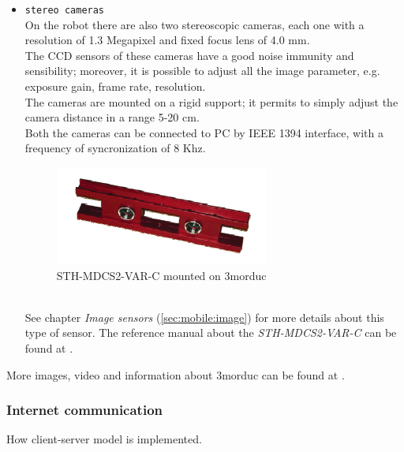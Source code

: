 \begin{itemize}
\item \texttt{stereo cameras} \\
  On the robot there are also two stereoscopic cameras, each one with a
  resolution of 1.3 Megapixel and fixed focus lens of 4.0 mm. \\
  The CCD sensors of these cameras have a good noise immunity and
  sensibility; moreover, it is possible to adjust all the image parameter, e.g.
  exposure gain, frame rate, resolution. \\
  The cameras are mounted on a rigid support; it permits to simply adjust
  the camera distance in a range 5-20 cm. \\
  Both the cameras can be connected to PC by IEEE 1394 interface, with a
  frequency of syncronization of 8 Khz. \\
  \begin{figure}[h]
    \begin{center}
      \includegraphics[width=200pt]{img/camera_videre.png}
      \caption{STH-MDCS2-VAR-C mounted on 3morduc}
      \label{fig:camera_videre}
    \end{center}
  \end{figure}
  \\
  See chapter \textit{Image sensors} (\ref{sec:mobile:image}) for more details
  about this type of sensor. The reference manual about the \textit{STH-MDCS2-VAR-C}
  can be found at \cite{3morduc:camera_sth_mdcs2}.

  

\end{itemize}

More images, video and information about 3morduc can
be found at \cite{morduc:features}.


\subsubsection{Internet communication}
\label{sec:3morduc:communication}

How client-server model is implemented.
